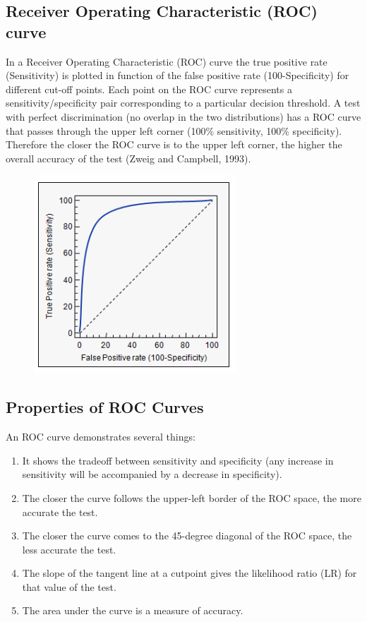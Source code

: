 \documentclass[12pt]{article} %
\begin{document}
\subsection{Receiver Operating Characteristic (ROC) curve }


In a Receiver Operating Characteristic (ROC) curve the true positive rate (Sensitivity) is plotted in function of the false positive rate (100-Specificity) for different cut-off points. Each point on the ROC curve represents a sensitivity/specificity pair corresponding to a particular decision threshold. A test with perfect discrimination (no overlap in the two distributions) has a ROC curve that passes through the upper left corner (100\% sensitivity, 100\% specificity). Therefore the closer the ROC curve is to the upper left corner, the higher the overall accuracy of the test (Zweig and Campbell, 1993).

\begin{figure}
	\centering
	\includegraphics[width=0.7\linewidth]{ROCcurve}
	\caption{}
	\label{fig:roccurve}
\end{figure}

\subsection{Properties of ROC Curves}
An ROC curve demonstrates several things:
\begin{enumerate}
	\item It shows the tradeoff between sensitivity and specificity (any increase in sensitivity will be accompanied by a decrease in specificity).
	\item The closer the curve follows the upper-left border of the ROC space, the more accurate the test.
	\item The closer the curve comes to the 45-degree diagonal of the ROC space, the less accurate the test.
	\item The slope of the tangent line at a cutpoint gives the likelihood ratio (LR) for that value of the test.
	\item The area under the curve is a measure of accuracy.
\end{enumerate}
\end{document}
